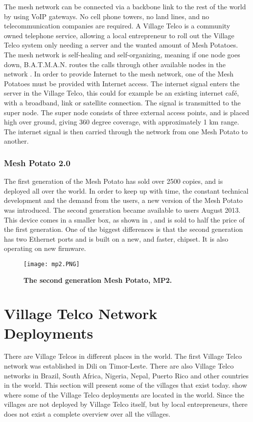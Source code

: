 The mesh network can be connected via a backbone link to the rest of the world by using VoIP gateways. No cell phone towers, no land lines, and no telecommunication companies are required. A Village Telco is a community owned telephone service, allowing a local entrepreneur to roll out the Village Telco system only needing a server and the wanted amount of Mesh Potatoes. The mesh network is self-healing and self-organizing, meaning if one node goes down, B.A.T.M.A.N. routes the calls through other available nodes in the network \cite{MPbyRowe}. In order to provide Internet to the mesh network, one of the Mesh Potatoes must be provided with Internet access. The internet signal enters the server in the Village Telco, this could for example be an existing internet café, with a broadband, link or satellite connection. The signal is transmitted to the super node. The super node consists of three external access points, and is placed high over ground, giving 360 degree coverage, with approximately 1 km range. The internet signal is then carried through the network from one Mesh Potato to another. 


\subsubsection{Mesh Potato 2.0}
The first generation of the Mesh Potato has sold over 2500 copies, and is deployed all over the world. In order to keep up with time, the constant technical development and the demand from the users, a new version of the Mesh Potato was introduced. The second generation became available to users August 2013. This device comes in a smaller box, as shown in , and is sold to half the price of the first generation. One of the biggest differences is that the second generation has two Ethernet ports and is built on a new, and faster, chipset. It is also  operating on new firmware.

\begin{figure}[h!]
  \centering
      \texttt{[image: mp2.PNG]}
  \caption [MP2]{\textbf{The second generation Mesh Potato, MP2.}}
  \label{fig:MP02}
\end{figure}

\section{Village Telco Network Deployments} \label{sec:deployments}
There are Village Telcos in different places in the world. The first Village Telco network was established in Dili on Timor-Leste. There are also Village Telco networks in Brazil, South Africa, Nigeria, Nepal, Puerto Rico and other countries in the world. This section will present some of the villages that exist today.  show where some of the Village Telco deployments are located in the world. Since the villages are not deployed by Village Telco itself, but by local entrepreneurs, there does not exist a complete overview over all the villages. 


